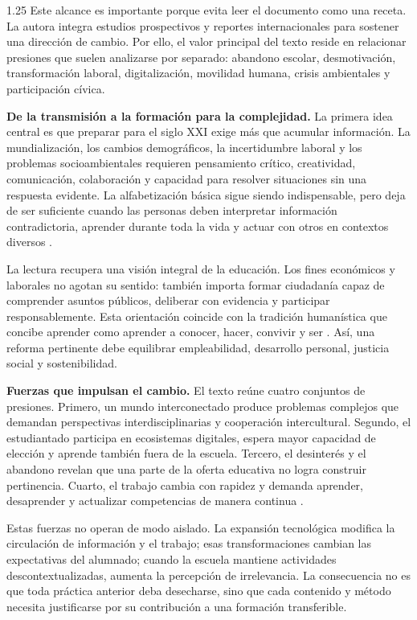 \documentclass[spanish,letterpaper,oneside]{article}
\begin{document}
\begin{reportelecturabox}
\begin{spacing}{1.25}
Este alcance es importante porque evita leer el documento como una receta. La autora integra estudios prospectivos y reportes internacionales para sostener una dirección de cambio. Por ello, el valor principal del texto reside en relacionar presiones que suelen analizarse por separado: abandono escolar, desmotivación, transformación laboral, digitalización, movilidad humana, crisis ambientales y participación cívica.

\medskip\noindent\textbf{De la transmisión a la formación para la complejidad.}\enspace
La primera idea central es que preparar para el siglo XXI exige más que acumular información. La mundialización, los cambios demográficos, la incertidumbre laboral y los problemas socioambientales requieren pensamiento crítico, creatividad, comunicación, colaboración y capacidad para resolver situaciones sin una respuesta evidente. La alfabetización básica sigue siendo indispensable, pero deja de ser suficiente cuando las personas deben interpretar información contradictoria, aprender durante toda la vida y actuar con otros en contextos diversos \citep{scott2015futuro}.

La lectura recupera una visión integral de la educación. Los fines económicos y laborales no agotan su sentido: también importa formar ciudadanía capaz de comprender asuntos públicos, deliberar con evidencia y participar responsablemente. Esta orientación coincide con la tradición humanística que concibe aprender como aprender a conocer, hacer, convivir y ser \citep{delors1996educacion}. Así, una reforma pertinente debe equilibrar empleabilidad, desarrollo personal, justicia social y sostenibilidad.

\medskip\noindent\textbf{Fuerzas que impulsan el cambio.}\enspace
El texto reúne cuatro conjuntos de presiones. Primero, un mundo interconectado produce problemas complejos que demandan perspectivas interdisciplinarias y cooperación intercultural. Segundo, el estudiantado participa en ecosistemas digitales, espera mayor capacidad de elección y aprende también fuera de la escuela. Tercero, el desinterés y el abandono revelan que una parte de la oferta educativa no logra construir pertinencia. Cuarto, el trabajo cambia con rapidez y demanda aprender, desaprender y actualizar competencias de manera continua \citep{scott2015futuro}.

Estas fuerzas no operan de modo aislado. La expansión tecnológica modifica la circulación de información y el trabajo; esas transformaciones cambian las expectativas del alumnado; cuando la escuela mantiene actividades descontextualizadas, aumenta la percepción de irrelevancia. La consecuencia no es que toda práctica anterior deba desecharse, sino que cada contenido y método necesita justificarse por su contribución a una formación transferible.


\end{spacing}
\end{reportelecturabox}
\end{document}
